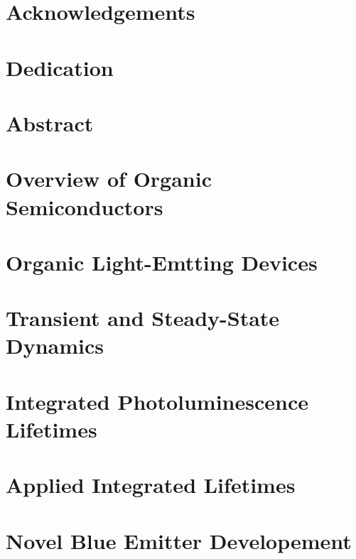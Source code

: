 \documentclass{article}
\begin{document}
\newcommand{\mainfile}{} 


\newpage

\section*{Acknowledgements}

\newpage

\section*{Dedication}

\newpage

\section*{Abstract}

\newpage


\newpage

\section{Overview of Organic Semiconductors}

\newpage

\section{Organic Light-Emtting Devices}

\newpage

\section{Transient and Steady-State Dynamics}

\newpage

\section{Integrated Photoluminescence Lifetimes}

\newpage

\section{Applied Integrated Lifetimes}

\newpage

\section{Novel Blue Emitter Developement}

\newpage
\end{document}
